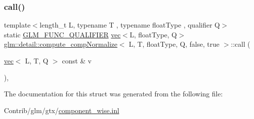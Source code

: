 \subsubsection{\texorpdfstring{call()}{call()}}
{\footnotesize\ttfamily template$<$length\+\_\+t L, typename T , typename float\+Type , qualifier Q$>$ \\
static \mbox{\hyperlink{setup_8hpp_a33fdea6f91c5f834105f7415e2a64407}{G\+L\+M\+\_\+\+F\+U\+N\+C\+\_\+\+Q\+U\+A\+L\+I\+F\+I\+ER}} \mbox{\hyperlink{structglm_1_1vec}{vec}}$<$L, float\+Type, Q$>$ \mbox{\hyperlink{structglm_1_1detail_1_1compute__comp_normalize}{glm\+::detail\+::compute\+\_\+comp\+Normalize}}$<$ L, T, float\+Type, Q, false, true $>$\+::call (\begin{DoxyParamCaption}\item[{\mbox{\hyperlink{structglm_1_1vec}{vec}}$<$ L, T, Q $>$ const \&}]{v }\end{DoxyParamCaption})\hspace{0.3cm}{\ttfamily [inline]}, {\ttfamily [static]}}



The documentation for this struct was generated from the following file\+:\begin{DoxyCompactItemize}
\item 
Contrib/glm/gtx/\mbox{\hyperlink{component__wise_8inl}{component\+\_\+wise.\+inl}}\end{DoxyCompactItemize}
